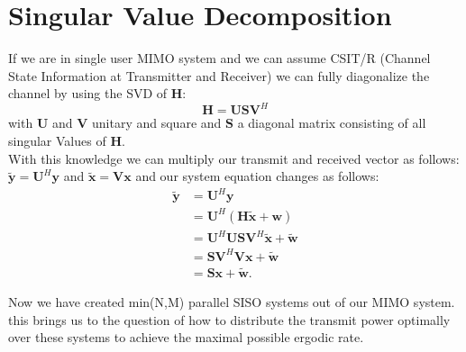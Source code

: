 \section{Singular Value Decomposition}
If we are in single user MIMO system and we can assume CSIT/R (Channel State Information at Transmitter and Receiver) we can fully diagonalize the channel by using the SVD of $\mathbf{H}$:
\begin{equation}
	\mathbf{H} = \mathbf{USV}^H
\end{equation}
with $\mathbf{U}$ and $\mathbf{V}$ unitary and square and $\mathbf{S}$ a diagonal matrix consisting of all singular Values of $\mathbf{H}$.\\
With this knowledge we can multiply our transmit and received vector as follows: $\mathbf{\tilde{y}} = \mathbf{U}^H\mathbf{y} $ and $ \mathbf{\tilde{x}} = \mathbf{Vx}$ and our system equation changes as follows: 
\begin{align}
	\mathbf{\tilde{y}} &= \mathbf{U}^H\mathbf{y} \\
	& = \mathbf{U}^H(\mathbf{H\tilde{x} + w}) \\
	& = \mathbf{U}^H\mathbf{USV}^H\mathbf{\tilde{x}+\tilde{w}}\\
	& = \mathbf{SV}^H\mathbf{Vx}+\mathbf{\tilde{w}}\\
	&= \mathbf{Sx + \tilde{w}}.
\end{align}

Now we have created min(N,M) parallel SISO systems out of our MIMO system. this brings us to the question of how to distribute the transmit power optimally over these systems to achieve the maximal possible ergodic rate.
